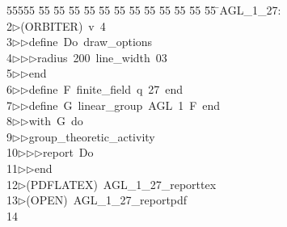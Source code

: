 %
%
\begin{tabbing}
55555 \= 55 \= 55 \= 55 \= 55 \= 55 \= 55 \= 55 \= 55 \= 55 \= 55 \= 55 \= 55 \= \>AGL\_1\_27:\\[0pt]
2\>$\triangleright$\>(ORBITER)\ v\ 4\ \\[0pt]
3\>$\triangleright$\>$\triangleright$\>define\ Do\ draw\_options\ \\[0pt]
4\>$\triangleright$\>$\triangleright$\>$\triangleright$\>radius\ 200\ line\_width\ 03\ \\[0pt]
5\>$\triangleright$\>$\triangleright$\>end\ \\[0pt]
6\>$\triangleright$\>$\triangleright$\>define\ F\ finite\_field\ q\ 27\ end\ \\[0pt]
7\>$\triangleright$\>$\triangleright$\>define\ G\ linear\_group\ AGL\ 1\ F\ end\ \\[0pt]
8\>$\triangleright$\>$\triangleright$\>with\ G\ do\ \\[0pt]
9\>$\triangleright$\>$\triangleright$\>group\_theoretic\_activity\ \\[0pt]
10\>$\triangleright$\>$\triangleright$\>$\triangleright$\>report\ Do\ \\[0pt]
11\>$\triangleright$\>$\triangleright$\>end\\[0pt]
12\>$\triangleright$\>(PDFLATEX)\ AGL\_1\_27\_reporttex\\[0pt]
13\>$\triangleright$\>(OPEN)\ AGL\_1\_27\_reportpdf\\[0pt]
14\>\end{tabbing}
